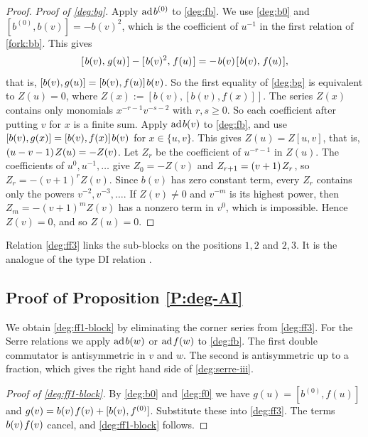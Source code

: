 \documentclass{amsart}
\numberwithin{equation}{section}
\theoremstyle{remark}
\renewcommand{\,}{\kern 0.1em} %
\begin{document}
\begin{proof}
{\it Proof of \eqref{deg:bg}.} Apply $\mathrm{ad}\,b^{(0)}$ to \eqref{deg:fb}. We use
\eqref{deg:b0} and $[b^{(0)},b(v)] = -b(v)^2$, which is the coefficient of $u^{-1}$ in the first
relation of \eqref{fork:bb}. This gives
%
\[
[\,b(v),\,g(u)\,] - [\,b(v)^2,\,f(u)\,] = -\,b(v)\,[\,b(v),\,f(u)\,] ,
\]
%
that is, $[b(v),g(u)] = [b(v),f(u)]\,b(v)$. So the first equality of \eqref{deg:bg} is equivalent to
$Z(u)=0$, where $Z(x) := [b(v),[b(v),f(x)]]$. The series $Z(x)$ contains only monomials
$x^{-r-1}v^{-s-2}$ with $r,s\ge0$. So each coefficient after putting $v$ for $x$ is a finite sum. Apply $\mathrm{ad}\,b(v)$ to \eqref{deg:fb}, and use
$[b(v),g(x)] = [b(v),f(x)]\,b(v)$ for $x\in\{u,v\}$. This gives $Z(u) = Z[u,v]$, that is,
$(u-v-1)\,Z(u) = -Z(v)$. Let $Z_r$ be the coefficient of $u^{-r-1}$ in $Z(u)$. The coefficients
of $u^0,u^{-1},\ldots$ give $Z_0=-Z(v)$ and $Z_{r+1}=(v+1)\,Z_r$, so $Z_r=-(v+1)^r Z(v)$. Since
$b(v)$ has zero constant term, every $Z_r$ contains only the powers $v^{-2},v^{-3},\ldots$. If
$Z(v)\ne0$ and $v^{-m}$ is its highest power, then $Z_m=-(v+1)^m Z(v)$ has a nonzero term in
$v^0$, which is impossible. Hence $Z(v)=0$, and so $Z(u)=0$.
%
\end{proof}

Relation \eqref{deg:ff3} links the sub-blocks on the positions $1,2$ and $2,3$. It is the
analogue of the type DI relation \cite[(5.51)]{Re26}.


\subsection{Proof of Proposition \ref{P:deg-AI}} \label{sec:deg-proof}

We obtain \eqref{deg:ff1-block} by eliminating the corner series from \eqref{deg:ff3}. For the
Serre relations we apply $\mathrm{ad}\,b(w)$ or $\mathrm{ad}\,f(w)$ to \eqref{deg:fb}. The first
double commutator is antisymmetric in $v$ and $w$. The second is antisymmetric up to a fraction,
which gives the right hand side of \eqref{deg:serre-iii}.

\begin{proof}[Proof of \eqref{deg:ff1-block}]
%
By \eqref{deg:b0} and \eqref{deg:f0} we have $g(u) = [b^{(0)},f(u)]$ and
$g(v) = b(v)\,f(v) + [b(v),f^{(0)}]$. Substitute these into \eqref{deg:ff3}. The terms
$b(v)\,f(v)$ cancel, and \eqref{deg:ff1-block} follows.
%
\end{proof}
\end{document}
